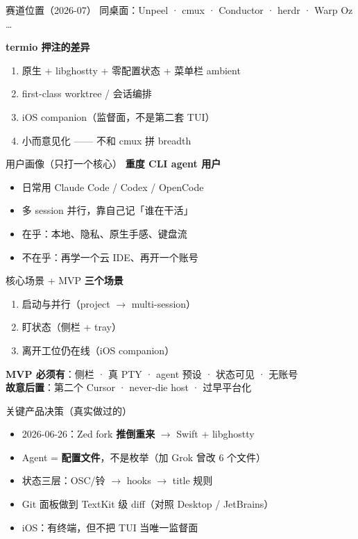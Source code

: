 \documentclass[aspectratio=169,10pt,UTF8]{ctexbeamer}
\begin{document}
\begin{frame}{赛道位置（2026-07）}
  同桌面：Unpeel · cmux · Conductor · herdr · Warp Oz \ldots

  \vspace{0.6em}
  \textbf{termio 押注的差异}
  \begin{enumerate}
    \item 原生 + libghostty + 零配置状态 + 菜单栏 ambient
    \item first-class worktree / 会话编排
    \item iOS companion（监督面，不是第二套 TUI）
    \item 小而意见化 —— 不和 cmux 拼 breadth
  \end{enumerate}
\end{frame}

\begin{frame}{用户画像（只打一个核心）}
  \textbf{重度 CLI agent 用户}
  \begin{itemize}
    \item 日常用 Claude Code / Codex / OpenCode
    \item 多 session 并行，靠自己记「谁在干活」
    \item 在乎：本地、隐私、原生手感、键盘流
    \item 不在乎：再学一个云 IDE、再开一个账号
  \end{itemize}
\end{frame}

\begin{frame}{核心场景 + MVP}
  \textbf{三个场景}
  \begin{enumerate}
    \item 启动与并行（project $\to$ multi-session）
    \item 盯状态（侧栏 + tray）
    \item 离开工位仍在线（iOS companion）
  \end{enumerate}
  \vspace{0.5em}
  \textbf{MVP 必须有}：侧栏 · 真 PTY · agent 预设 · 状态可见 · 无账号\\
  \textbf{故意后置}：第二个 Cursor · never-die host · 过早平台化
\end{frame}

\begin{frame}{关键产品决策（真实做过的）}
  \begin{itemize}
    \item 2026-06-26：Zed fork \textbf{推倒重来} $\to$ Swift + libghostty
    \item Agent = \textbf{配置文件}，不是枚举（加 Grok 曾改 6 个文件）
    \item 状态三层：OSC/铃 $\to$ hooks $\to$ title 规则
    \item Git 面板做到 TextKit 级 diff（对照 Desktop / JetBrains）
    \item iOS：有终端，但不把 TUI 当唯一监督面
  \end{itemize}
\end{frame}
\end{document}

